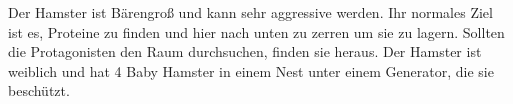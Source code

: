 \begin{npcBox}[title=Hamster]
    \begin{stressSection}
    \end{stressSection}
    \begin{tabularx}{\textwidth}{ XX }
    \end{tabularx}

    \begin{consequences}
    \item {}
    \item {}
    \item {}
    \end{consequences}

    \begin{npcDescription}
    Der Hamster ist Bärengroß und kann sehr aggressive werden. Ihr normales Ziel ist es, Proteine zu finden und hier nach unten zu zerren um sie zu lagern. Sollten die Protagonisten den Raum durchsuchen, finden sie heraus. Der Hamster ist weiblich und hat 4 Baby Hamster in einem Nest unter einem Generator, die sie beschützt.
    \end{npcDescription}

\end{npcBox}


